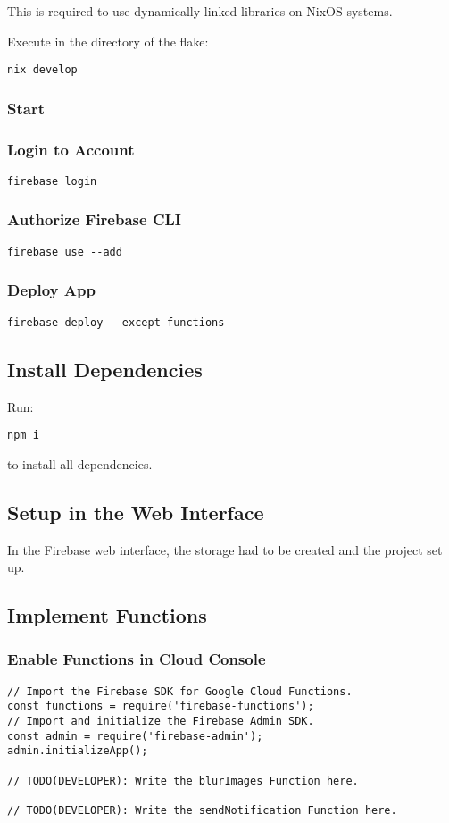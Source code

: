 This is required to use dynamically linked libraries on NixOS systems.

Execute in the directory of the flake:
\begin{verbatim}
nix develop
\end{verbatim}

\subsubsection{Start}

\subsubsection{Login to Account}
\begin{verbatim}
firebase login
\end{verbatim}

\subsubsection{Authorize Firebase CLI}
\begin{verbatim}
firebase use --add
\end{verbatim}

\subsubsection{Deploy App}
\begin{verbatim}
firebase deploy --except functions
\end{verbatim}

\subsection{Install Dependencies}
Run:
\begin{verbatim}
npm i
\end{verbatim}
to install all dependencies.

\subsection{Setup in the Web Interface}
In the Firebase web interface, the storage had to be created and the project set up.

\subsection{Implement Functions}

\subsubsection{Enable Functions in Cloud Console}
\begin{verbatim}
// Import the Firebase SDK for Google Cloud Functions.
const functions = require('firebase-functions');
// Import and initialize the Firebase Admin SDK.
const admin = require('firebase-admin');
admin.initializeApp();

// TODO(DEVELOPER): Write the blurImages Function here.

// TODO(DEVELOPER): Write the sendNotification Function here.
\end{verbatim}

